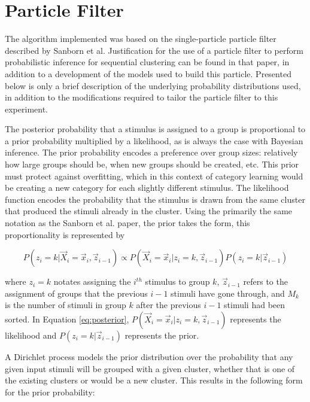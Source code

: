 \section*{Particle Filter}
The algorithm implemented was based on the single-particle particle filter
described by Sanborn et al\cite{sanborn2010}. Justification for the use of a
particle filter to perform probabilistic inference for sequential clustering can
be found in that paper, in addition to a development of the models used to build
this particle. Presented below is only a brief description of the underlying
probability distributions used, in addition to the modifications required to
tailor the particle filter to this experiment.

The posterior probability that a stimulus is assigned to a group is proportional
to a prior probability multiplied by a likelihood, as is always the case with
Bayesian inference. The prior probability encodes a preference over group sizes:
relatively how large groups should be, when new groups should be created, etc.
This prior must protect against overfitting, which in this context of category
learning would be creating a new category for each slightly different stimulus.
The likelihood function encodes the probability that the stimulus is drawn from
the same cluster that produced the stimuli already in the cluster. Using the
primarily the same notation as the Sanborn et al. paper, the prior takes the
form, this proportionality is represented by

\begin{equation}
P(z_i = k | \vec{X}_i = \vec{x}_i,  \vec{z}_{i-1}) \propto  P(\vec{X}_i =
\vec{x}_i | z_i = k,  \vec{z}_{i-1}) P(z_i = k | \vec{z}_{i-1})
\label{eq:posterior}
\end{equation}

where $z_i = k$ notates assigning the $i^{th}$ stimulus to group $k$, $\vec{z}_{i-1}$ refers to
the assignment of groups that the previous $i - 1$ stimuli have gone through,
and $M_k$ is the number of stimuli in group $k$ after the previous $i - 1$
stimuli had been sorted. In Equation \ref{eq:posterior}, $P(\vec{X}_i =
\vec{x}_i | z_i = k,  \vec{z}_{i-1})$ represents the likelihood and $P(z_i = k |
\vec{z}_{i-1})$ represents the prior.

A Dirichlet process models the prior distribution over the probability that
any given input stimuli will be grouped with a given cluster, whether that is one
of the existing clusters or would be a new cluster. This results in the
following form for the prior probability:

